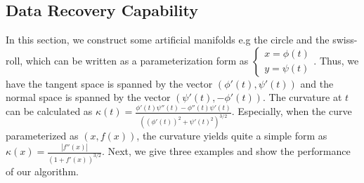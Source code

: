 \documentclass{article}
\theoremstyle{remark}
\newtheorem{example}{Example}
\begin{document}
\subsection{Data Recovery Capability}
In this section, we construct some artificial manifolds e.g the circle and the swiss-roll, which can be written as a parameterization form as
$
\left\{
\begin{array}{c}
x = \phi(t)\\
y = \psi(t)
\end{array}
\right.
$.
Thus, we have the tangent space is spanned by the vector $(\phi'(t),\psi'(t))$ and the normal space is spanned by the vector $(\psi'(t),-\phi'(t))$. The curvature at $t$ can be calculated as
$\kappa(t) = \frac{\phi'(t)\psi''(t)-\phi''(t)\psi'(t)}{((\phi'(t))^2+\psi'(t)^2)^{3/2}}.$
Especially, when the curve parameterized as $(x,f(x))$, the curvature yields quite a simple form as
$\kappa(x) = \frac{|f''(x)|}{(1+f'(x))^{3/2}}$. Next, we give three examples and show the performance of our algorithm.
\end{document}
